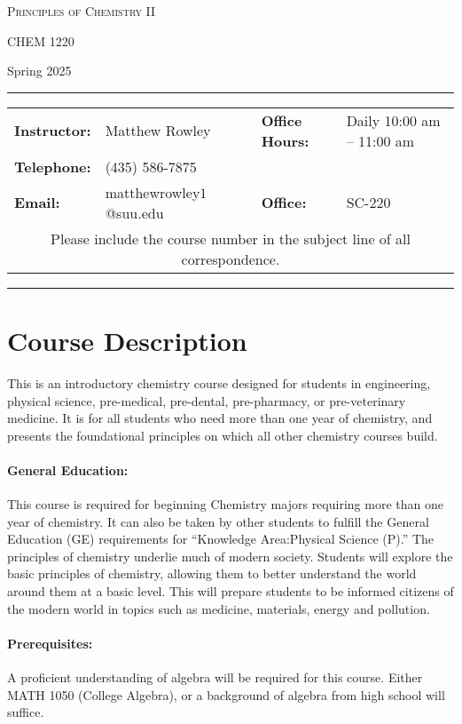 \documentclass[12pt, letterpaper]{article}
\begin{document}
\begin{center}
	{\Large \textsc{Principles of Chemistry II}}

	CHEM 1220
\end{center}

\begin{center}
	{\large Spring 2025}
\end{center}
\begin{center}
	\rule{0.99\textwidth}{0.4pt}
	\begin{tabular}{llcll}
		\textbf{Instructor:} & Matthew Rowley           &  & \textbf{Office Hours:} & Daily 10:00 am -- 11:00 am \\
		\textbf{Telephone:}  & (435) 586-7875           &  &                        &                            \\
		\textbf{Email:}      & matthewrowley$1$@suu.edu &  & \textbf{Office:}       & SC-220                     \\
		\multicolumn{5}{c}{Please include the course number in the subject line of all correspondence.}
	\end{tabular}
	\rule{0.99\textwidth}{0.4pt}
\end{center}

\section*{Course Description}
This is an introductory chemistry course designed for students in engineering, physical science, pre-medical, pre-dental, pre-pharmacy, or pre-veterinary medicine. It is for all students who need more than one year of chemistry, and presents the foundational principles on which all other chemistry courses build.

\paragraph{General Education:}
This course is required for beginning Chemistry majors requiring more than one year of chemistry. It can also be taken by other students to fulfill the General Education (GE) requirements for ``Knowledge Area:Physical Science (P).'' The principles of chemistry underlie much of modern society. Students will explore the basic principles of chemistry, allowing them to better understand the world around them at a basic level. This will prepare students to be informed citizens of the modern world in topics such as medicine, materials, energy and pollution.

\paragraph{Prerequisites:}
A proficient understanding of algebra will be required for this course. Either MATH 1050 (College Algebra), or a background of algebra from high school will suffice.
\end{document}
